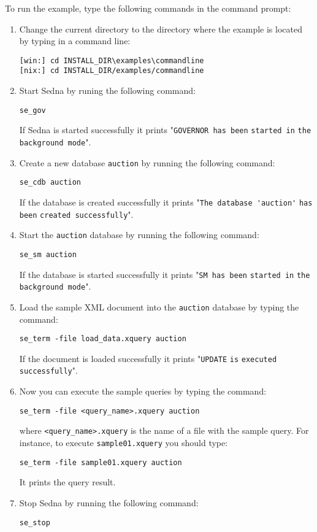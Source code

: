 \documentclass[a4paper,12pt]{article}
\begin{document}
To run the example, type the following commands in the command prompt:
\begin{enumerate}
\item Change the current directory to the directory where the example is located
by typing in a command line:
\begin{verbatim}
[win:] cd INSTALL_DIR\examples\commandline
[nix:] cd INSTALL_DIR/examples/commandline
\end{verbatim}

\item Start Sedna by runing the following command: 
\begin{verbatim}
se_gov 
\end{verbatim}
If Sedna is started successfully it prints "\verb!GOVERNOR has been!
\verb!started in! \verb!the background mode!".

\item Create a new database \verb!auction! by running the following command: 
\begin{verbatim}
se_cdb auction
\end{verbatim}
If the database is created successfully it prints "\verb!The database 'auction'!
\verb!has been! \verb!created successfully!".

\item Start the \verb!auction! database by running the following command:
\begin{verbatim}
se_sm auction
\end{verbatim}
If the database is started successfully it prints "\verb!SM has been!
\verb!started in! \verb!the background mode!".

\item Load the sample XML document into the \verb!auction! database by typing
the command:
\begin{verbatim}
se_term -file load_data.xquery auction
\end{verbatim}
If the document is loaded successfully it prints "\verb!UPDATE! \verb!is!
\verb!executed! \verb!successfully!".

\item Now you can execute the sample queries by typing the command:
\begin{verbatim}
se_term -file <query_name>.xquery auction
\end{verbatim}
where \verb!<query_name>.xquery! is the name of a file with the sample query.
For instance, to execute \verb!sample01.xquery! you should type:
\begin{verbatim}
se_term -file sample01.xquery auction
\end{verbatim}
It prints the query result.

\item Stop Sedna by running the following command:
\begin{verbatim}
se_stop
\end{verbatim}
\end{enumerate}
\end{document}
